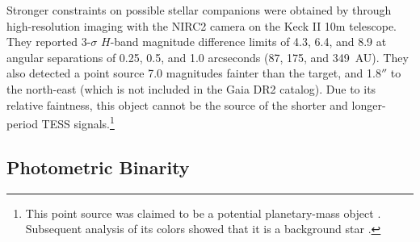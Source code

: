 \documentclass[12pt,twocolumn,tighten]{aastex62}
\begin{document}
Stronger constraints on possible stellar companions were obtained by
\citet{van_eyken_ptf_2012} through high-resolution imaging with the
NIRC2 camera on the Keck II 10m telescope.  They reported 3-$\sigma$
$H$-band magnitude difference limits of 4.3, 6.4, and 8.9 at angular
separations of 0.25, 0.5, and 1.0 arcseconds (87, 175, and 349~AU).
They also detected a point source 7.0 magnitudes fainter than the
target, and 1.8$''$ to the north-east (which is not included in the
Gaia DR2 catalog). Due to its relative faintness, this object cannot
be the source of the shorter and longer-period TESS
signals.\footnote{This point source was claimed to be a potential
planetary-mass object \citep{schmidt_direct_2016}.  Subsequent
analysis of its colors showed that it is a background star
\citep{lee_evidence_2018}.} 


\subsection{Photometric Binarity}
\end{document}
